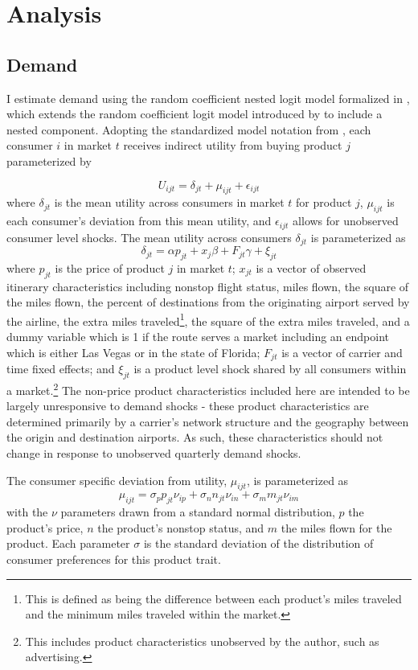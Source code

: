 \documentclass{article}
\begin{document}
	\section{Analysis}
	\label{sec:Analysis} 	 
 	 	 
	\subsection{Demand}
	\label{sec:Analysis_Demand}
	I estimate demand using the random coefficient nested logit model formalized in \citet{grigolon_nested_2014}, which extends the random coefficient logit model introduced by \citet{berry_automobile_1995} to include a nested component.  Adopting the standardized model notation from \citet{conlon_best_2020}, each consumer $i$ in market $t$ receives indirect utility from buying product $j$ parameterized by 
	
	\[U_{ijt} = \delta_{jt} + \mu_{ijt} + \epsilon_{ijt}\] where $\delta_{jt}$ is the mean utility across consumers in market $t$ for product $j$, $\mu_{ijt}$ is each consumer's deviation from this mean utility, and $\epsilon_{ijt}$ allows for unobserved consumer level shocks. The mean utility across consumers $\delta_{jt}$ is parameterized as \[\delta_{jt} = \alpha p_{jt} + x_{j} \beta + F_{jt}\gamma  +  \xi_{jt}\] where $p_{jt}$ is the price of product $j$ in market $t$; $x_{jt}$ is a vector of observed itinerary characteristics including nonstop flight status, miles flown, the square of the miles flown, the percent of destinations from the originating airport served by the airline, the extra miles traveled\footnote{This is defined as being the difference between each product's miles traveled and the minimum miles traveled within the market.}, the square of the extra miles traveled, and a dummy variable which is 1 if the route serves a market including an endpoint which is either Las Vegas or in the state of Florida; $F_{jt}$ is a vector of carrier and time fixed effects; and $\xi_{jt}$ is a product level shock shared by all consumers within a market.\footnote{This includes product characteristics unobserved by the author, such as advertising.} The non-price product characteristics included here are intended to be largely unresponsive to demand shocks - these product characteristics are determined primarily by a carrier's network structure and the geography between the origin and destination airports. As such, these characteristics should not change in response to unobserved quarterly demand shocks.
	 
    The consumer specific deviation from utility, $\mu_{ijt}$, is parameterized as \[\mu_{ijt} = \sigma_{p} p_{jt} \nu_{ip} + \sigma_{n} n_{jt} \nu_{in} + \sigma_{m} m_{jt} \nu_{im} \] with the $\nu$ parameters drawn from a standard normal distribution, $p$ the product's price, $n$ the product's nonstop status, and $m$ the miles flown for the product. Each parameter $\sigma$ is the standard deviation of the distribution of consumer preferences for this product trait.  
    
\end{document}
